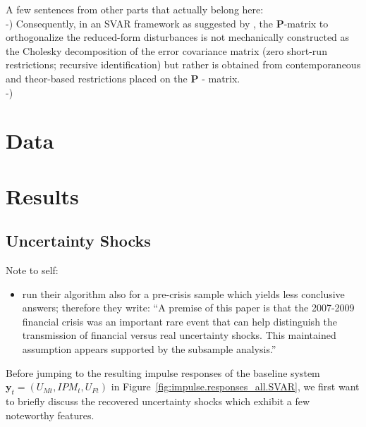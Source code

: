 \documentclass[a4paper,11pt,listof=nochaptergap,oneside,pointednumbers,bibtotoc,bigheadings,liststotoc]{scrbook}
\theoremstyle{mysatz}
\theoremstyle{mydefinition}
\theoremstyle{mybemerkung}
\newcommand{\vect}[1]{\boldsymbol{\mathbf{#1}}}
\begin{document}
A few sentences from other parts that actually belong here:\\
-) Consequently, in an SVAR framework as suggested by \citet{ludvigsonetal:18}, the $\vect{P}$-matrix to orthogonalize the reduced-form disturbances is not mechanically constructed as the Cholesky decomposition of the error covariance matrix (zero short-run restrictions; recursive identification) but rather is obtained from contemporaneous and theor-based restrictions placed on the $\vect{P}$ - matrix.\\
-) 


\chapter{Data}
\label{sec:Data}

\chapter{Results}
\label{sec:Results}

\section{Uncertainty Shocks}


\begingroup
    \fontsize{8pt}{12pt}\selectfont
    Note to self:
\begin{itemize}
	\item \citet[p. 25]{ludvigsonetal:18} run their algorithm also for a pre-crisis sample which yields less conclusive answers; therefore they write: ``A premise of this paper is that the 2007-2009 financial crisis was an important rare event that can help distinguish the transmission of financial versus real uncertainty shocks. This maintained assumption appears supported by the subsample analysis.''
\end{itemize}
\endgroup

Before jumping to the resulting impulse responses of the baseline system $\vect{y}_t = (U_{Mt}, IPM_{t}, U_{Ft})$ in Figure~\ref{fig:impulse.responses_all.SVAR}, we first want to briefly discuss the recovered uncertainty shocks which exhibit a few noteworthy features. \\
\\
\end{document}
